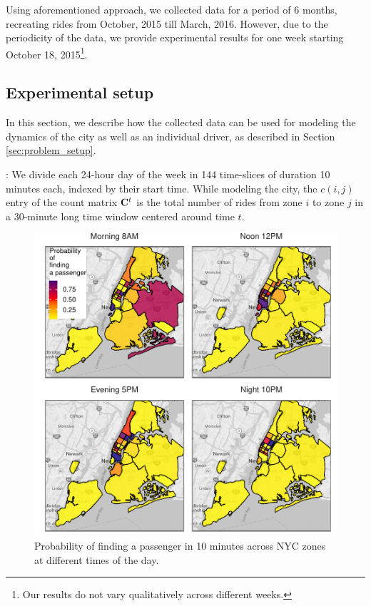 Using aforementioned approach, we collected data for a period of 6 months, recreating rides from October, 2015 till March, 2016. However, due to the periodicity of the data, we provide experimental results for one week starting October 18, 2015\footnote{Our results do not vary qualitatively across different weeks.}.

\subsection{Experimental setup}
In this section, we describe how the collected data can be used for modeling the dynamics of the city as well as an individual driver, as described in Section \ref{sec:problem_setup}.


:
We divide each 24-hour day of the week in 144 time-slices of duration 10 minutes each, indexed by their start time. While modeling the city, the $c(i,j)$ entry of the count matrix ${\mathbf{C}}^t$ is the total number of rides from zone $i$ to zone $j$ in a 30-minute long time window centered around time $t$. 

\begin{figure}
	\centering
	\includegraphics{figures/successful_heatmap.pdf}
	\caption{Probability of finding a passenger in 10 minutes across NYC zones at different times of the day.}
	\label{fig:successful_heatmap}
\end{figure}

